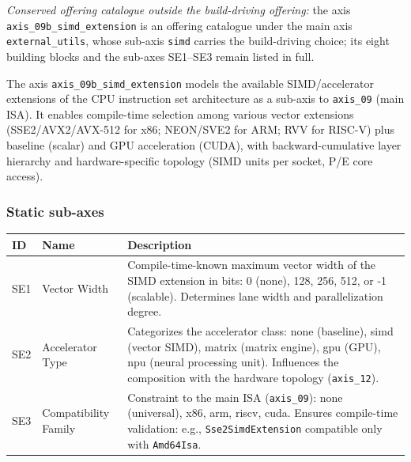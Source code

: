 \emph{Conserved offering catalogue outside the build-driving offering:} the axis \texttt{axis\_\allowbreak{}09b\_\allowbreak{}simd\_\allowbreak{}extension} is an offering catalogue under the main axis \texttt{external\_\allowbreak{}utils}, whose sub-axis \texttt{simd} carries the build-driving choice; its eight building blocks and the sub-axes SE1--SE3 remain listed in full.

The axis \texttt{axis\_\allowbreak{}09b\_\allowbreak{}simd\_\allowbreak{}extension} models the available SIMD/\allowbreak{}accelerator extensions of the CPU instruction set architecture as a sub-axis to \texttt{axis\_\allowbreak{}09} (main ISA). It enables compile-time selection among various vector extensions (SSE2/\allowbreak{}AVX2/\allowbreak{}AVX-512 for x86; NEON/\allowbreak{}SVE2 for ARM\@; RVV for RISC-V) plus baseline (scalar) and GPU acceleration (CUDA), with backward-cumulative layer hierarchy and hardware-specific topology (SIMD units per socket, P/\allowbreak{}E core access).

\subsubsection*{Static sub-axes}

\begin{scriptsize}
\begin{longtable}{@{}>{\raggedright\arraybackslash}p{1.8cm} >{\raggedright\arraybackslash}p{3.2cm} >{\raggedright\arraybackslash}p{8.5cm}@{}}
\toprule
ID & Name & Description \\
\midrule
\endhead%
SE1 & Vector Width & Compile-time-known maximum vector width of the SIMD extension in bits: 0 (none), 128, 256, 512, or -1 (scalable). Determines lane width and parallelization degree. \\
SE2 & Accelerator Type & Categorizes the accelerator class: none (baseline), simd (vector SIMD), matrix (matrix engine), gpu (GPU), npu (neural processing unit). Influences the composition with the hardware topology (\texttt{axis\_\allowbreak{}12}). \\
SE3 & Compatibility Family & Constraint to the main ISA (\texttt{axis\_\allowbreak{}09}): none (universal), x86, arm, riscv, cuda. Ensures compile-time validation: e.g., \texttt{Sse2\allowbreak{}Simd\allowbreak{}Extension} compatible only with \texttt{Amd64\allowbreak{}Isa}. \\
\bottomrule
\end{longtable}
\end{scriptsize}

